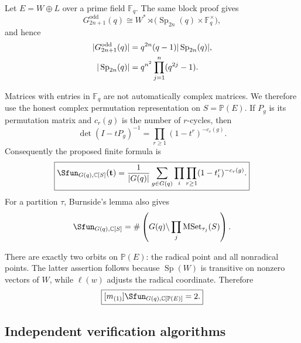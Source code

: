 \documentclass[10pt]{article}
\newcommand{\Sp}{\operatorname{Sp}}
\begin{document}
Let $E=W\oplus L$ over a prime field $\mathbb F_q$. The same block proof gives
\begin{equation}
 G^{\mathrm{odd}}_{2n+1}(q)
 \cong W^*\rtimes\bigl(\Sp_{2n}(q)\times\mathbb F_q^\times\bigr),
\end{equation}
and hence
\begin{align}
 |G^{\mathrm{odd}}_{2n+1}(q)|
 &=q^{2n}(q-1)|\Sp_{2n}(q)|,\notag\\
 |\Sp_{2n}(q)|&=q^{n^2}\prod_{j=1}^n(q^{2j}-1).
\end{align}

Matrices with entries in $\mathbb F_q$ are not automatically complex matrices.
We therefore use the honest complex permutation representation on
$S=\mathbb P(E)$. If $P_g$ is its permutation matrix and $c_r(g)$ is the
number of $r$-cycles, then
\begin{equation}
 \det(I-tP_g)^{-1}=\prod_{r\ge1}(1-t^r)^{-c_r(g)}.
\end{equation}
Consequently the proposed finite formula is
\begin{equation}
 \boxed{\Sfun_{G(q),\mathbb C[S]}(\mathbf t)
 =\frac1{|G(q)|}\sum_{g\in G(q)}
 \prod_i\prod_{r\ge1}(1-t_i^r)^{-c_r(g)}.}
\end{equation}
For a partition $\tau$, Burnside's lemma also gives
\begin{equation}
 [m_\tau]\Sfun_{G(q),\mathbb C[S]}
 =\#\left(G(q)\backslash\prod_j\operatorname{MSet}_{\tau_j}(S)\right).
\end{equation}

There are exactly two orbits on $\mathbb P(E)$: the radical point and all
nonradical points. The latter assertion follows because $\Sp(W)$ is transitive
on nonzero vectors of $W$, while $\ell(w)$ adjusts the radical coordinate.
Therefore
\begin{equation}
 \boxed{[m_{(1)}]\Sfun_{G(q),\mathbb C[\mathbb P(E)]}=2.}
\end{equation}

\subsection{Independent verification algorithms}
\end{document}
